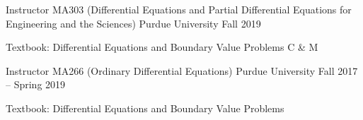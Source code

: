 

\begin{cventries}

  \cventry
    {Instructor} %
    {MA303 (Differential Equations and Partial Differential Equations for
      Engineering and the Sciences)} %
    {Purdue University} %
    {Fall 2019} %
    {
      \begin{cvitems} %
        \item {Textbook:  Differential Equations and Boundary Value Problems
          C \& M}
      \end{cvitems}
    }

  \cventry
    {Instructor} %
    {MA266 (Ordinary Differential Equations)} %
    {Purdue University} %
    {Fall 2017 -- Spring 2019} %
    {
      \begin{cvitems} %
        \item {Textbook: Differential Equations and Boundary Value Problems}
      \end{cvitems}
    }

\end{cventries}
